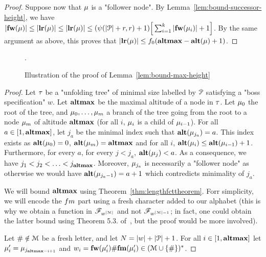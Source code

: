 \begin{proof}
	Suppose now that $\mu$ is a "follower node". By Lemma~\ref{lem:bound-successor-height}, we have 
	$|\mathbf{fw}(\mu)| \leq |\mathbf{lr}(\mu)| \leq |\mathbf{lr}(\mu)| \leq (\psi(|\mathcal{P}|+r,r)+1) \Big[\sum_{i=1}^k |\mathbf{fw}(\mu_i)|+1\Big]$.
	By the same argument as above, this proves that $|\mathbf{lr}(\mu)| \leq f_0(\mathbf{altmax} - \mathbf{alt}(\mu)+1)$.
\end{proof}

\begin{figure}
	
	\caption{Illustration of the proof of Lemma~\ref{lem:bound-max-height}}.
	\label{fig:max-height-bound}
\end{figure}

\lemBoundMaxHeight*

\begin{proof}
	Let $\tau$ be a "unfolding tree" of minimal size labelled by $\mathcal{P}$ satisfying a "boss specification" $w$. Let $\mathbf{altmax}$ be the maximal altitude of a node in $\tau$. Let $\mu_0$ the root of the tree, and  $\mu_0, \ldots, \mu_m$ a branch of the tree going from the root to a node $\mu_m$ of altitude $\mathbf{altmax}$ (for all $i$, $\mu_i$ is a child of $\mu_{i-1}$).
	For all $a \in [1,\mathbf{altmax}]$, let $j_a$ be the minimal index such that $\mathbf{alt}(\mu_{j_a}) = a$. This index exists as $\mathbf{alt}(\mu_0) = 0$, $\mathbf{alt}(\mu_m) = \mathbf{altmax}$ and for all $i$, $\mathbf{alt}(\mu_{i}) \leq \mathbf{alt}(\mu_{i-1})+1$.
	Furthermore, for every $a$, for every $j < j_a$, $\mathbf{alt}(\mu_j) < a$. 
	As a consequence, we have $j_1 < j_2 < \ldots < j_{\mathbf{altmax}}$. Moreover, $\mu_{j_a}$ is necessarily a "follower node" as otherwise we would have $\mathbf{alt}(\mu_{j_a-1}) = a+1$ which contredicts minimality of $j_a$.
	
	We will bound $\mathbf{altmax}$ using Theorem~\ref{thm:lengthfcttheorem}. Forr simplicity, we will encode the $\followmessagespec$ part using a fresh character added to our alphabet (this is why we obtain a function in $\mathscr{F}_{w^{|\mathcal{M}|}}$ and not $\mathscr{F}_{w^{|\mathcal{M}|-1}}$; in fact, one could obtain the latter bound using Theorem 5.3. of~\cite{SchmitzS2011upperHigman}, but the proof would be more involved).

	Let $\# \notin \mathcal{M}$ be a fresh letter, and let $N = |w| + |\mathcal{P}|+1$. For all $i \in [1,\mathbf{altmax}]$ let $\mu'_i = \mu_{j_{\mathbf{altmax} - i+1}}$ and $w_i = \mathbf{fw}(\mu'_{i}) \# \mathbf{fm}(\mu'_{i}) \in (\mathcal{M} \cup \{\#\})^*$.
	

\end{proof}
